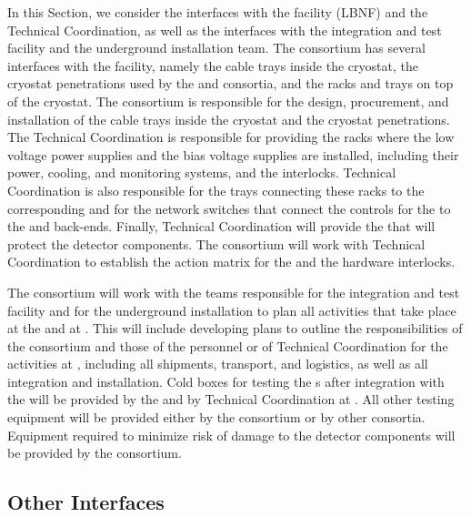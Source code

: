 In this Section, we consider the interfaces with the facility (LBNF)
and the  Technical Coordination, as well as the interfaces with
the integration and test facility and the underground
installation team. The  consortium has several
interfaces with the facility, namely the cable trays inside the
cryostat, the cryostat penetrations used by the 
and  consortia, and the racks and trays on top
of the cryostat. The  consortium is responsible
for the design, procurement, and installation of the cable trays
inside the cryostat and the cryostat penetrations. The 
Technical Coordination is responsible for providing the racks
where the low voltage power supplies and the bias voltage supplies are installed,
including their power, cooling, and monitoring systems, and the interlocks.
Technical Coordination is also responsible for the trays connecting these racks 
to the corresponding  and for the network switches that
connect the controls for the  to the
 and  back-ends. Finally, Technical Coordination will
provide the  that will protect
the  detector components. The 
consortium will work with Technical Coordination to establish
the action matrix for the  and the hardware
interlocks.

The  consortium will work with the teams responsible
for the integration and test facility and for the underground installation
to plan all activities that take place at the  and at
. This will include developing plans to outline the responsibilities
of the consortium and those of the  personnel or of 
Technical Coordination for the activities at , including all 
shipments, transport, and logistics, as well as all
integration and installation. Cold boxes for testing
the s after integration with the  will be 
provided by the  and by Technical Coordination at .
All other testing equipment will be provided either by the 
consortium or by other consortia. Equipment required to
minimize risk of  damage to the detector components
will  be provided by the  consortium. 

\subsection{Other Interfaces}
\label{sec:fdsp-tpcelec-interfaces-other}


